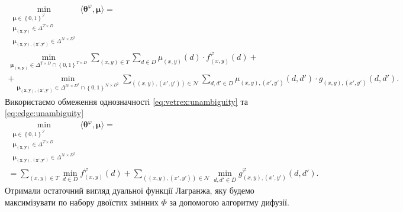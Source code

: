 \begin{equation*}
\begin{gathered}
    \min \limits_{\substack{\pmb{\mu} \in \left\{ 0, 1 \right\}^{\mathcal{I}} \\
                            \pmb{\mu_{\left(x, y \right)}} \in \Delta^{T \times D} \\
                            \pmb{\mu_{\left(x, y \right), \left(x', y' \right)}} \in
                                \Delta^{\mathcal{N} \times D^2}}}
        \langle \pmb{\theta}^{\varphi}, \pmb{\mu} \rangle = \\
    \min \limits_{\pmb{\mu_{\left(x, y \right)}}\in \Delta^{T \times D} \cap \left\{0, 1 \right\}^{T \times D}}
        \sum \limits_{\left(x, y \right) \in T}
            \sum \limits_{d \in D}
                \mu_{\left(x, y \right)} \left( d \right) \cdot
                f_{\left(x, y \right)}^{\varphi} \left(d \right) + \\
    + \min \limits_{\pmb{\mu_{\left(x, y \right), \left(x', y' \right)}}\in \Delta^{\mathcal{N} \times D^2} \cap \left\{0, 1 \right\}^{\mathcal{N} \times D^2}}
        \sum \limits_{\left(\left(x, y \right), \left(x', y' \right) \right) \in \mathcal{N}}
            \sum \limits_{d, d' \in D}
                \mu_{\left(x, y \right), \left(x', y' \right)} \left(d, d' \right) \cdot
                g_{\left(x, y \right), \left(x', y' \right)} \left(d, d' \right).
\end{gathered}
\end{equation*}
Використаємо обмеження однозначності \eqref{eq:vetrex:unambiguity} та
\eqref{eq:edge:unambiguity}
\begin{equation} \label{eq:lagrange:dual:MAP}
\begin{gathered}
    \min \limits_{\substack{\pmb{\mu} \in \left\{ 0, 1 \right\}^{\mathcal{I}} \\
                            \pmb{\mu_{\left(x, y \right)}} \in \Delta^{T \times D} \\
                            \pmb{\mu_{\left(x, y \right), \left(x', y' \right)}} \in
                                \Delta^{\mathcal{N} \times D^2}}}
        \langle \pmb{\theta}^{\varphi}, \pmb{\mu} \rangle = \\
    = \sum \limits_{\left(x, y \right) \in T}
        \min \limits_{d \in D}
            f_{\left(x, y \right)}^{\varphi} \left(d \right) +
    \sum \limits_{\left(\left(x, y \right), \left(x', y' \right) \right) \in \mathcal{N}}
        \min_{d, d' \in D} g_{\left(x, y \right), \left(x', y' \right)}^{\varphi} \left(d, d' \right).
\end{gathered}
\end{equation}
Отримали остаточний вигляд дуальної функції Лагранжа,
яку будемо максимізувати по набору двоїстих змінних $\Phi$
за допомогою алгоритму дифузії.

